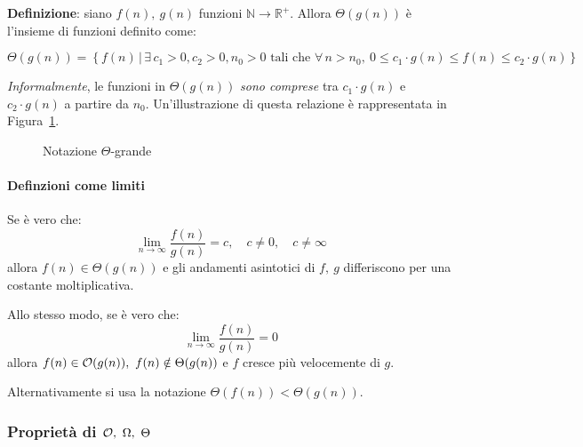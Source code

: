 \documentclass[italian, 10pt]{article}
\begin{document}
\textbf{Definizione}: siano \(f(n),\ g(n)\) funzioni \(\mathbb{N} \rightarrow \mathbb{R}^+\).
Allora \(\Theta(g(n))\) è l'insieme di funzioni definito come:

\[ \Theta(g(n)) = \left\{ f(n) \, | \, \exists \, c_1 > 0, c_2 > 0, n_0 > 0 \text{ tali che } \forall \, n > n_0, \ 0 \leq c_1 \cdot g(n) \leq f(n) \leq c_2 \cdot g(n)  \right\} \]

\bigskip
\textit{Informalmente}, le funzioni in \(\Theta(g(n))\) \textit{sono comprese} tra  \(c_1 \cdot g(n)\) e \(c_2 \cdot g(n)\) a partire da \(n_0\).
Un'illustrazione di questa relazione è rappresentata in Figura~\ref{fig:notazione-theta-grande}.

\begin{figure}[htbp]
  \bigskip
  \centering
  \caption{Notazione \(\Theta\)-grande}
  \label{fig:notazione-theta-grande}
  \bigskip
\end{figure}

\paragraph{Definzioni come limiti}

Se è vero che:
\[ \displaystyle \lim_{n \rightarrow \infty} \dfrac{f(n)}{g(n)} = c, \quad c \neq 0, \quad c \neq \infty \]
allora \(f(n) \in \Theta(g(n))\) e gli andamenti asintotici di \(f,\ g\) differiscono per una costante moltiplicativa.

\bigskip
Allo stesso modo, se è vero che:
\[ \displaystyle \lim_{n \rightarrow \infty} \dfrac{f(n)}{g(n)} = 0 \]
allora \(f(n) \in \mathcal{O}(g(n)), \ f(n) \notin \Theta(g(n))\) e \(f\) cresce più velocemente di \(g\).

Alternativamente si usa la notazione \(\Theta(f(n)) < \Theta(g(n))\).

\subsubsection[Proprietà di O, Omega, Theta]{Proprietà di \(\mathcal{O},\ \Omega,\ \Theta\)}
\end{document}
